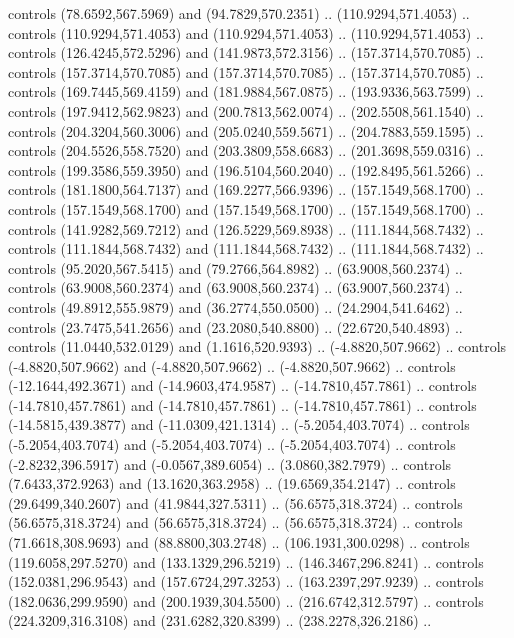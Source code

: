 \begin{scope}[shift={(69.41462,-293.94043)}]
    controls (78.6592,567.5969) and (94.7829,570.2351) .. (110.9294,571.4053) ..
    controls (110.9294,571.4053) and (110.9294,571.4053) .. (110.9294,571.4053) ..
    controls (126.4245,572.5296) and (141.9873,572.3156) .. (157.3714,570.7085) ..
    controls (157.3714,570.7085) and (157.3714,570.7085) .. (157.3714,570.7085) ..
    controls (169.7445,569.4159) and (181.9884,567.0875) .. (193.9336,563.7599) ..
    controls (197.9412,562.9823) and (200.7813,562.0074) .. (202.5508,561.1540) ..
    controls (204.3204,560.3006) and (205.0240,559.5671) .. (204.7883,559.1595) ..
    controls (204.5526,558.7520) and (203.3809,558.6683) .. (201.3698,559.0316) ..
    controls (199.3586,559.3950) and (196.5104,560.2040) .. (192.8495,561.5266) ..
    controls (181.1800,564.7137) and (169.2277,566.9396) .. (157.1549,568.1700) ..
    controls (157.1549,568.1700) and (157.1549,568.1700) .. (157.1549,568.1700) ..
    controls (141.9282,569.7212) and (126.5229,569.8938) .. (111.1844,568.7432) ..
    controls (111.1844,568.7432) and (111.1844,568.7432) .. (111.1844,568.7432) ..
    controls (95.2020,567.5415) and (79.2766,564.8982) .. (63.9008,560.2374) ..
    controls (63.9008,560.2374) and (63.9008,560.2374) .. (63.9007,560.2374) ..
    controls (49.8912,555.9879) and (36.2774,550.0500) .. (24.2904,541.6462) ..
    controls (23.7475,541.2656) and (23.2080,540.8800) .. (22.6720,540.4893) ..
    controls (11.0440,532.0129) and (1.1616,520.9393) .. (-4.8820,507.9662) ..
    controls (-4.8820,507.9662) and (-4.8820,507.9662) .. (-4.8820,507.9662) ..
    controls (-12.1644,492.3671) and (-14.9603,474.9587) .. (-14.7810,457.7861) ..
    controls (-14.7810,457.7861) and (-14.7810,457.7861) .. (-14.7810,457.7861) ..
    controls (-14.5815,439.3877) and (-11.0309,421.1314) .. (-5.2054,403.7074) ..
    controls (-5.2054,403.7074) and (-5.2054,403.7074) .. (-5.2054,403.7074) ..
    controls (-2.8232,396.5917) and (-0.0567,389.6054) .. (3.0860,382.7979) ..
    controls (7.6433,372.9263) and (13.1620,363.2958) .. (19.6569,354.2147) ..
    controls (29.6499,340.2607) and (41.9844,327.5311) .. (56.6575,318.3724) ..
    controls (56.6575,318.3724) and (56.6575,318.3724) .. (56.6575,318.3724) ..
    controls (71.6618,308.9693) and (88.8800,303.2748) .. (106.1931,300.0298) ..
    controls (119.6058,297.5270) and (133.1329,296.5219) .. (146.3467,296.8241) ..
    controls (152.0381,296.9543) and (157.6724,297.3253) .. (163.2397,297.9239) ..
    controls (182.0636,299.9590) and (200.1939,304.5500) .. (216.6742,312.5797) ..
    controls (224.3209,316.3108) and (231.6282,320.8399) .. (238.2278,326.2186) ..

\end{scope}
